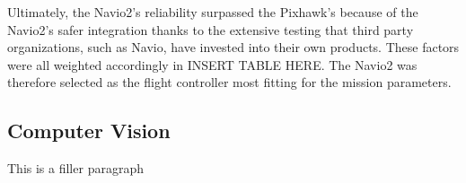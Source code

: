 		Ultimately, the Navio2’s reliability surpassed the Pixhawk’s because of the Navio2’s safer integration thanks to the extensive testing that third party organizations, such as Navio, have invested into their own products. These factors were all weighted accordingly in INSERT TABLE HERE. The Navio2 was therefore selected as the flight controller most fitting for the mission parameters. 

		\subsection{Computer Vision}
			This is a filler paragraph
